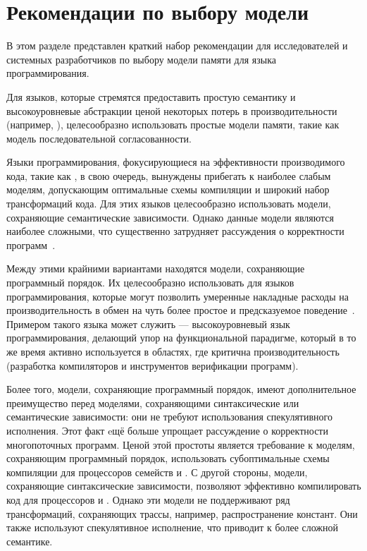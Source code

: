 \section{Рекомендации по выбору модели}
\label{sec:discussion}

В этом разделе представлен краткий набор рекомендации для 
исследователей и системных разработчиков 
по выбору модели памяти для  языка программирования.

Для языков, которые стремятся предоставить простую семантику 
и высокоуровневые абстракции ценой некоторых потерь в 
производительности (например, \Haskell), 
целесообразно использовать простые модели памяти, такие как 
модель последовательной согласованности. 

Языки программирования, фокусирующиеся на 
эффективности производимого кода, 
такие как \CPP, в свою очередь, вынуждены 
прибегать к наиболее слабым моделям, 
допускающим оптимальные схемы компиляции и 
широкий набор трансформаций кода. 
Для этих языков целесообразно использовать
модели, сохраняющие семантические зависимости. 
Однако данные модели являются наиболее сложными, 
что существенно затрудняет рассуждения о 
корректности программ~\cite{Svendsen-al:ESOP18}. 

Между этими крайними вариантами  находятся модели, 
сохраняющие программный порядок. 
Их целесообразно использовать для языков программирования, 
которые могут позволить умеренные накладные 
расходы на производительность в обмен 
на чуть более простое и предсказуемое поведение~\cite{Ou-Demsky:OOPSLA18}. 
Примером такого языка может служить \OCaml --- 
высокоуровневый язык программирования, делающий упор 
на функциональной парадигме, который в то же время 
активно используется в областях, где критична производительность (разработка компиляторов и инструментов верификации программ). 

Более того, модели, сохраняющие программный порядок, 
имеют дополнительное преимущество перед моделями, 
сохраняющими синтаксические или семантические зависимости: они не требуют использования 
спекулятивного исполнения. 
Этот факт eщё больше упрощает рассуждение о корректности многопоточных программ. 
Ценой этой простоты является требование к моделям, сохраняющим программный порядок, 
использовать субоптимальные схемы компиляции 
для процессоров семейств \ARM и \POWER.
С другой стороны, модели, сохраняющие синтаксические зависимости, 
позволяют эффективно компилировать код для процессоров \ARM и \POWER. Однако
эти модели не поддерживают ряд трансформаций, 
сохраняющих трассы, например, распространение констант. 
Они также используют спекулятивное исполнение, 
что приводит к более сложной семантике.  

